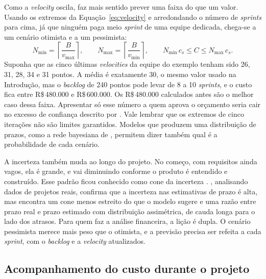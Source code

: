 Como a \textit{velocity} oscila, faz mais sentido prever uma faixa do que um
valor. Usando os extremos da Equação~\ref{eq:velocity} e arredondando o número de
\textit{sprints} para cima, já que ninguém paga meio \textit{sprint} de uma
equipe dedicada, chega-se a um cenário otimista e a um pessimista:
%
\begin{equation}
  N_{\min} = \left\lceil \frac{B}{v_{\max}} \right\rceil, \qquad
  N_{\max} = \left\lceil \frac{B}{v_{\min}} \right\rceil, \qquad
  N_{\min}\,c_s \le C \le N_{\max}\,c_s .
  \label{eq:intervalo}
\end{equation}
%
Suponha que as cinco últimas \textit{velocities} da equipe do exemplo tenham sido
26, 31, 28, 34 e 31 pontos. A média é exatamente 30, o mesmo valor usado na
Introdução, mas o \textit{backlog} de 240 pontos pode levar de 8 a 10
\textit{sprints}, e o custo fica entre R\$\,480.000 e R\$\,600.000. Os
R\$\,480.000 calculados antes são o melhor caso dessa faixa. Apresentar só esse
número a quem aprova o orçamento seria cair no excesso de confiança descrito por
. Vale lembrar que os extremos de cinco iterações não
são limites garantidos. Modelos que produzem uma distribuição de prazos, como a
rede bayesiana de , permitem dizer também qual é a
probabilidade de cada cenário.

A incerteza também muda ao longo do projeto. No começo, com requisitos ainda
vagos, ela é grande, e vai diminuindo conforme o produto é entendido e
construído. Esse padrão ficou conhecido como cone da incerteza \cite{boehm1981}.
, analisando dados de projetos reais, confirma que a
incerteza nas estimativas de prazo é alta, mas encontra um cone menos estreito
do que o modelo sugere e uma razão entre prazo real e prazo estimado com
distribuição assimétrica, de cauda longa para o lado dos atrasos. Para quem faz
a análise financeira, a lição é dupla. O cenário pessimista merece mais peso que
o otimista, e a previsão precisa ser refeita a cada \textit{sprint}, com o
\textit{backlog} e a \textit{velocity} atualizados.

\subsection{Acompanhamento do custo durante o projeto}
\label{sub:agileevm}

